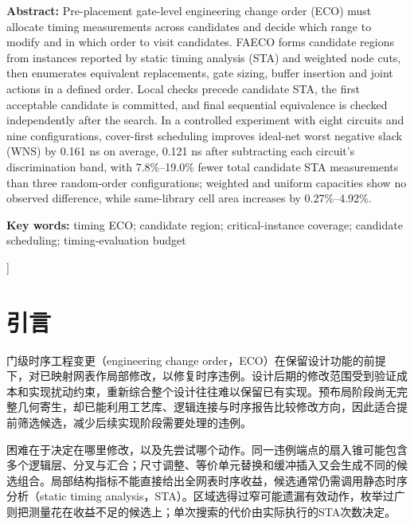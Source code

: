 \documentclass[twocolumn,10pt,fontset=windows]{ctexart}
\begin{document}
\begin{flushleft}
  {\bfseries Abstract:} {\small Pre-placement gate-level engineering change order (ECO) must allocate timing measurements across candidates and decide which range to modify and in which order to visit candidates. FAECO forms candidate regions from instances reported by static timing analysis (STA) and weighted node cuts, then enumerates equivalent replacements, gate sizing, buffer insertion and joint actions in a defined order. Local checks precede candidate STA, the first acceptable candidate is committed, and final sequential equivalence is checked independently after the search. In a controlled experiment with eight circuits and nine configurations, cover-first scheduling improves ideal-net worst negative slack (WNS) by 0.161 ns on average, 0.121 ns after subtracting each circuit's discrimination band, with 7.8\%--19.0\% fewer total candidate STA measurements than three random-order configurations; weighted and uniform capacities show no observed difference, while same-library cell area increases by 0.27\%--4.92\%.}\par
\vspace{3pt}
{\bfseries Key words:} {\small timing ECO; candidate region; critical-instance coverage; candidate scheduling; timing-evaluation budget}\par
\end{flushleft}
]%




\section{引言}

门级时序工程变更（engineering change order，ECO）在保留设计功能的前提下，对已映射网表作局部修改，以修复时序违例。设计后期的修改范围受到验证成本和实现扰动约束，重新综合整个设计往往难以保留已有实现。预布局阶段尚无完整几何寄生，却已能利用工艺库、逻辑连接与时序报告比较修改方向，因此适合提前筛选候选，减少后续实现阶段需要处理的违例。

困难在于决定在哪里修改，以及先尝试哪个动作。同一违例端点的扇入锥可能包含多个逻辑层、分叉与汇合；尺寸调整、等价单元替换和缓冲插入又会生成不同的候选组合。局部结构指标不能直接给出全网表时序收益，候选通常仍需调用静态时序分析（static timing analysis，STA）。区域选得过窄可能遗漏有效动作，枚举过广则把测量花在收益不足的候选上；单次搜索的代价由实际执行的STA次数决定。
\end{document}
